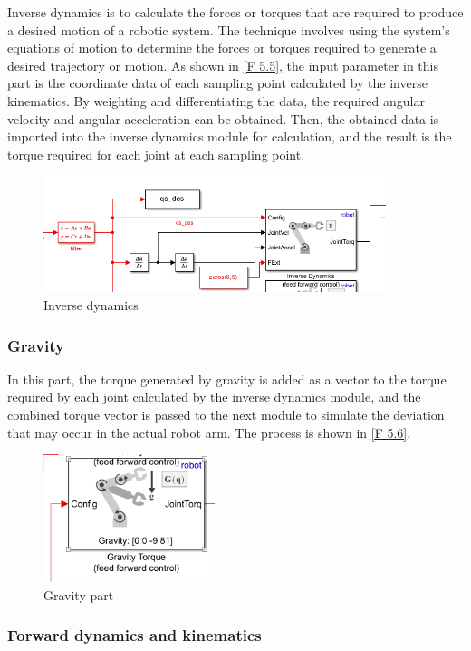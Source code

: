 Inverse dynamics is to calculate the forces or torques that are required to produce a desired motion of a robotic system. The technique involves using the system's equations of motion to determine the forces or torques required to generate a desired trajectory or motion. As shown in \autoref{F 5.5}, the input parameter in this part is the coordinate data of each sampling point calculated by the inverse kinematics. By weighting and differentiating the data, the required angular velocity and angular acceleration can be obtained. Then, the obtained data is imported into the inverse dynamics module for calculation, and the result is the torque required for each joint at each sampling point.

\begin{figure}[htbp]
	\centering
	\includegraphics[width=10cm]{./fig/ID.png}
	\caption{Inverse dynamics}
	\label{F 5.5}
\end{figure}

\subsubsection*{Gravity}


In this part, the torque generated by gravity is added as a vector to the torque required by each joint calculated by the inverse dynamics module, and the combined torque vector is passed to the next module to simulate the deviation that may occur in the actual robot arm. The process is shown in \autoref{F 5.6}.


\begin{figure}[htbp]
	\centering
	\includegraphics[width=5cm]{./fig/G.png}
	\caption{Gravity part}
	\label{F 5.6}
\end{figure}


\subsubsection*{Forward dynamics and kinematics}


